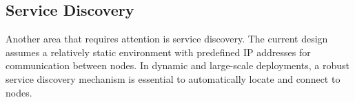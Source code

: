 \documentclass{article}
\begin{document}
  \subsection{Service Discovery}
  Another area that requires attention is service discovery. The current design assumes a relatively
  static environment with predefined IP addresses for communication between nodes.
  In dynamic and large-scale deployments, a robust service discovery mechanism is essential to automatically
  locate and connect to nodes.
\end{document}
